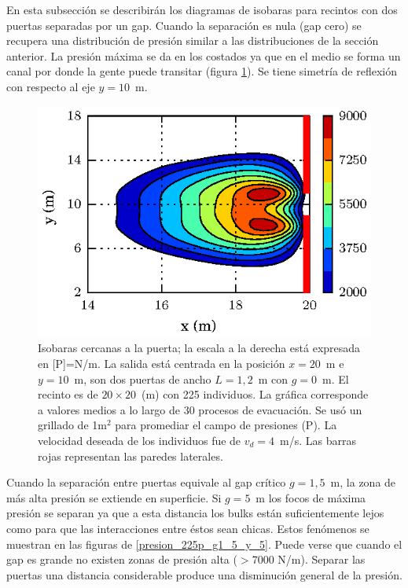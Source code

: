 En esta subsección se describirán los diagramas de isobaras para recintos con dos puertas separadas por un gap. 
Cuando la separación es nula (gap cero) se recupera una distribución de presión similar a las distribuciones de la sección anterior. La presión máxima se da en los costados ya que en el medio se forma un canal por donde la gente puede transitar (figura \ref{presion_225p_g0}). Se tiene simetría de reflexión con respecto al eje $y=10$~m. 
\begin{figure}[H]
    \centering
    \includegraphics[scale=1.6]{figuras/press_225p_v4_g0.eps}
    \caption[width=5cm]{Isobaras cercanas a la puerta; la escala a la derecha está expresada en [P]=N/m. La salida está centrada en la posición $x=20$~m e $y=10$~m, son dos puertas de ancho $L=1,2$~m con $g=0$~m. El recinto es de $20\times 20$~(m) con 225 individuos. La gráfica corresponde a valores medios a lo largo de 30 procesos de evacuación. Se usó un grillado de 1m$^2$ para promediar el campo de presiones (P). La velocidad deseada de los individuos fue de $v_d=4$~m/s. Las barras rojas representan las paredes laterales.}
    \label{presion_225p_g0}
\end{figure}

Cuando la separación entre puertas equivale al gap crítico $g=1,5$~m, la zona de más alta presión se extiende en superficie. Si $g=5$~m los focos de máxima presión se separan ya que a esta distancia los bulks están suficientemente lejos como para que las interacciones entre éstos sean chicas. Estos fenómenos se muestran en las figuras de \ref{presion_225p_g1_5_y_5}. Puede verse que cuando el gap es grande no existen zonas de presión alta ($>$7000 N/m). Separar las puertas una distancia considerable produce una disminución general de la presión. \\

